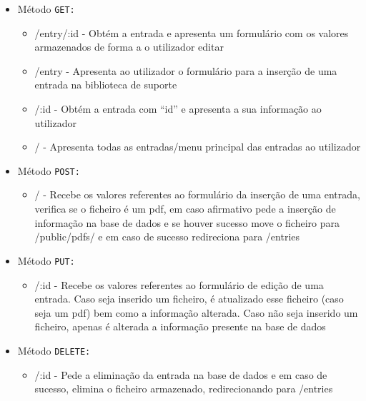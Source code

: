         \begin{itemize}
            \item Método \texttt{GET:}
                \begin{itemize}
                    \item /entry/:id - Obtém a entrada e apresenta um formulário com os valores armazenados de forma a o utilizador editar
                    \item /entry - Apresenta ao utilizador o formulário para a inserção de uma entrada na biblioteca de suporte
                    \item /:id - Obtém a entrada com ``id'' e apresenta a sua informação ao utilizador
                    \item / - Apresenta todas as entradas/menu principal das entradas ao utilizador
                \end{itemize}
            \item Método \texttt{POST:}
                \begin{itemize}
                    \item / - Recebe os valores referentes ao formulário da inserção de uma entrada, verifica se o ficheiro é um pdf, em caso afirmativo pede a inserção de informação na base de dados e se houver sucesso move o ficheiro para /public/pdfs/ e em caso de sucesso redireciona para /entries
                \end{itemize}
            \item Método \texttt{PUT:}
                \begin{itemize}
                    \item /:id - Recebe os valores referentes ao formulário de edição de uma entrada. Caso seja inserido um ficheiro, é atualizado esse ficheiro (caso seja um pdf) bem como a informação alterada. Caso não seja inserido um ficheiro, apenas é alterada a informação presente na base de dados
                \end{itemize}
            \item Método \texttt{DELETE:}
                \begin{itemize}
                    \item /:id -  Pede a eliminação da entrada na base de dados e em caso de sucesso, elimina o ficheiro armazenado, redirecionando para /entries
                \end{itemize}
        \end{itemize}

